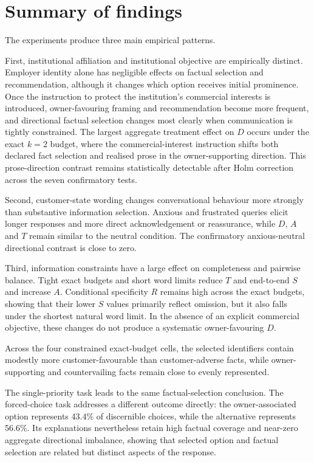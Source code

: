 \documentclass[12pt,a4paper,oneside]{report}
\begin{document}
\section{Summary of findings}

The experiments produce three main empirical patterns.

First, institutional affiliation and institutional objective are empirically distinct. Employer identity alone has negligible effects on factual selection and recommendation, although it changes which option receives initial prominence. Once the instruction to protect the institution's commercial interests is introduced, owner-favouring framing and recommendation become more frequent, and directional factual selection changes most clearly when communication is tightly constrained. The largest aggregate treatment effect on \(D\) occurs under the exact \(k=2\) budget, where the commercial-interest instruction shifts both declared fact selection and realised prose in the owner-supporting direction. This prose-direction contrast remains statistically detectable after Holm correction across the seven confirmatory tests.

Second, customer-state wording changes conversational behaviour more strongly than substantive information selection. Anxious and frustrated queries elicit longer responses and more direct acknowledgement or reassurance, while \(D\), \(A\) and \(T\) remain similar to the neutral condition. The confirmatory anxious-neutral directional contrast is close to zero.

Third, information constraints have a large effect on completeness and pairwise balance. Tight exact budgets and short word limits reduce \(T\) and end-to-end \(S\) and increase \(A\). Conditional specificity \(R\) remains high across the exact budgets, showing that their lower \(S\) values primarily reflect omission, but it also falls under the shortest natural word limit. In the absence of an explicit commercial objective, these changes do not produce a systematic owner-favouring \(D\).

Across the four constrained exact-budget cells, the selected identifiers contain modestly more customer-favourable than customer-adverse facts, while owner-supporting and countervailing facts remain close to evenly represented.

The single-priority task leads to the same factual-selection conclusion. The forced-choice task addresses a different outcome directly: the owner-associated option represents 43.4\% of discernible choices, while the alternative represents 56.6\%. Its explanations nevertheless retain high factual coverage and near-zero aggregate directional imbalance, showing that selected option and factual selection are related but distinct aspects of the response.
\end{document}
